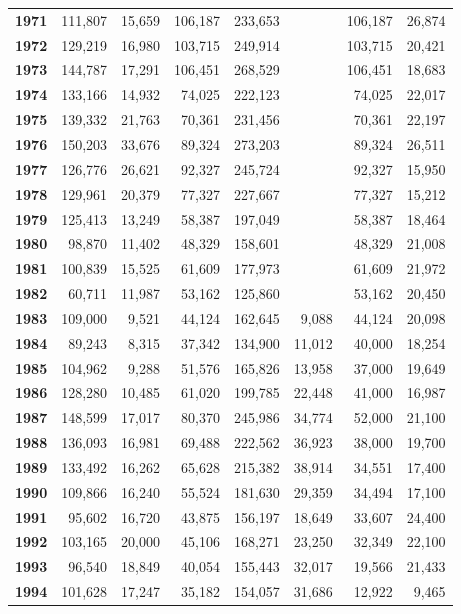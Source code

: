 {\begin{table}[h]
{\begin{tabular}{@{}>{\bfseries}r r r r r r r r@{}}
1971 & 111,807 & 15,659 & 106,187 & 233,653 &  & 106,187 & 26,874 \\
1972 & 129,219 & 16,980 & 103,715 & 249,914 &  & 103,715 & 20,421 \\
1973 & 144,787 & 17,291 & 106,451 & 268,529 &  & 106,451 & 18,683 \\
1974 & 133,166 & 14,932 & 74,025 & 222,123 &  & 74,025 & 22,017 \\
1975 & 139,332 & 21,763 & 70,361 & 231,456 &  & 70,361 & 22,197 \\
1976 & 150,203 & 33,676 & 89,324 & 273,203 &  & 89,324 & 26,511 \\
1977 & 126,776 & 26,621 & 92,327 & 245,724 &  & 92,327 & 15,950 \\
1978 & 129,961 & 20,379 & 77,327 & 227,667 &  & 77,327 & 15,212 \\
1979 & 125,413 & 13,249 & 58,387 & 197,049 &  & 58,387 & 18,464 \\
1980 & 98,870 & 11,402 & 48,329 & 158,601 &  & 48,329 & 21,008 \\
1981 & 100,839 & 15,525 & 61,609 & 177,973 &  & 61,609 & 21,972 \\
1982 & 60,711 & 11,987 & 53,162 & 125,860 &  & 53,162 & 20,450 \\
1983 & 109,000 & 9,521 & 44,124 & 162,645 & 9,088 & 44,124 & 20,098 \\
1984 & 89,243 & 8,315 & 37,342 & 134,900 & 11,012 & 40,000 & 18,254 \\
1985 & 104,962 & 9,288 & 51,576 & 165,826 & 13,958 & 37,000 & 19,649 \\
1986 & 128,280 & 10,485 & 61,020 & 199,785 & 22,448 & 41,000 & 16,987 \\
1987 & 148,599 & 17,017 & 80,370 & 245,986 & 34,774 & 52,000 & 21,100 \\
1988 & 136,093 & 16,981 & 69,488 & 222,562 & 36,923 & 38,000 & 19,700 \\
1989 & 133,492 & 16,262 & 65,628 & 215,382 & 38,914 & 34,551 & 17,400 \\
1990 & 109,866 & 16,240 & 55,524 & 181,630 & 29,359 & 34,494 & 17,100 \\
1991 & 95,602 & 16,720 & 43,875 & 156,197 & 18,649 & 33,607 & 24,400 \\
1992 & 103,165 & 20,000 & 45,106 & 168,271 & 23,250 & 32,349 & 22,100 \\
1993 & 96,540 & 18,849 & 40,054 & 155,443 & 32,017 & 19,566 & 21,433 \\
1994 & 101,628 & 17,247 & 35,182 & 154,057 & 31,686 & 12,922 & 9,465 \\

\end{tabular}}
\end{table}}
